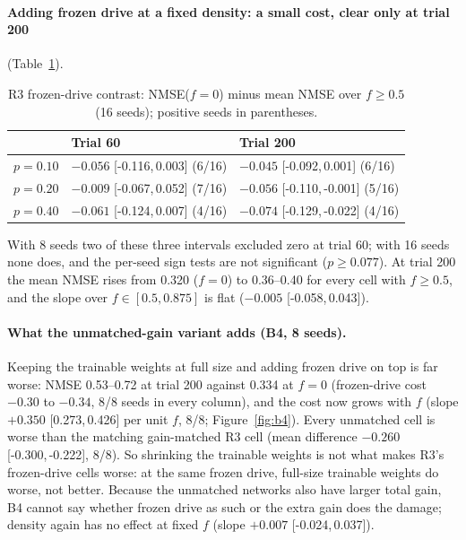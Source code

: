 \documentclass[11pt]{article}
\newcommand{\ci}[2]{[#1,\,#2]}
\begin{document}
\paragraph{Adding frozen drive at a fixed density: a small cost, clear only
at trial 200} (Table~\ref{tab:r3frozen}).

\begin{table}[ht]
\centering
\small
\caption{R3 frozen-drive contrast: NMSE($f=0$) minus mean NMSE over
$f\ge0.5$ (16 seeds); positive seeds in parentheses.}
\label{tab:r3frozen}
\begin{tabular}{lll}
\toprule
& Trial 60 & Trial 200\\
\midrule
$p=0.10$ & $-0.056$ \ci{-0.116}{0.003} (6/16) & $-0.045$ \ci{-0.092}{0.001} (6/16)\\
$p=0.20$ & $-0.009$ \ci{-0.067}{0.052} (7/16) & $-0.056$ \ci{-0.110}{-0.001} (5/16)\\
$p=0.40$ & $-0.061$ \ci{-0.124}{0.007} (4/16) & $-0.074$ \ci{-0.129}{-0.022} (4/16)\\
\bottomrule
\end{tabular}
\end{table}

With 8 seeds two of these three intervals excluded zero at trial 60; with 16
seeds none does, and the per-seed sign tests are not significant
($p\ge0.077$). At trial 200 the mean NMSE rises from 0.320 ($f=0$) to
0.36--0.40 for every cell with $f\ge0.5$, and the slope over
$f\in[0.5,0.875]$ is flat ($-0.005$ \ci{-0.058}{0.043}).

\paragraph{What the unmatched-gain variant adds (B4, 8 seeds).} Keeping the
trainable weights at full size and adding frozen drive on top is far worse:
NMSE 0.53--0.72 at trial 200 against 0.334 at $f=0$ (frozen-drive cost
$-0.30$ to $-0.34$, 8/8 seeds in every column), and the cost now grows with
$f$ (slope $+0.350$ \ci{0.273}{0.426} per unit $f$, 8/8;
Figure~\ref{fig:b4}). Every unmatched cell is worse than the matching
gain-matched R3 cell (mean difference $-0.260$ \ci{-0.300}{-0.222}, 8/8). So
shrinking the trainable weights is not what makes R3's frozen-drive cells
worse: at the same frozen drive, full-size trainable weights do worse, not
better. Because the unmatched networks also have larger total gain, B4 cannot
say whether frozen drive as such or the extra gain does the damage; density
again has no effect at fixed $f$ (slope $+0.007$ \ci{-0.024}{0.037}).
\end{document}
